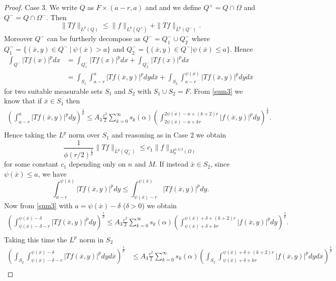 \documentclass[12pt]{article}
\theoremstyle{definition}
\begin{document}
\begin{proof}
Case 3. We write $Q$ as $F \times (a-r,a)$ and and we define $Q^+=Q\cap\Omega$ and $Q^-=Q\cap\Omega^-.$ Then 
\[\|Tf\|_{L^p(Q)}\le\|f\|_{L^p(Q^+)}+\|Tf\|_{L^p(Q^-)}.\]
Moreover $Q^-$ can be furtherly decompose as $Q^-=Q^-_1 \cup Q^-_2$ where $Q^-_1=\{ (\overline x,y) \in Q^- \ | \ \psi(\overline x)>a \}$ and $Q^-_2=\{ (\overline x,y) \in Q^- | \psi(\overline x)\le a \}$. Hence
\begin{align*} \int_{Q^-} |Tf(x)|^pdx &= \int_{Q^-_1} |Tf(x)|^pdx +\int_{Q^-_2} |Tf(x)|^pdx\\
&=\int_{S_1} \int_{a-r}^{a} |Tf(\overline x,y)|^pdy d\overline x+\int_{S_2} \int_{a-r}^{\psi(\overline x)} |Tf(\overline x,y)|^pdy d\overline x
\end{align*}
for two suitable measurable sets $S_1$ and $S_2$ with $S_1 \cup S_2 = F.$ From \eqref{sum3} we know that if $\overline x \in S_1$ then
\begin{align*}
 \left(\int_{a-r}^{a}|Tf(\overline x,y)|^p dy\right)^{\frac{1}{p}} \le A_3\frac{c^2}{2} \sum_{k=0}^\infty s_k(\alpha) \left ( \int_{2\psi(\overline x) -a +kr}^{2\psi(\overline x) -a +(k+2)r}|f(\overline x, y)|^p  dy \right) ^{\frac{1}{p}}. \\
\end{align*}
Hence taking the $L^p$ norm over $S_1$ and reasoning as in Case 2 we obtain
\begin{equation}
\frac{1}{\phi(r/2)^{\frac{1}{p}}} \| Tf\|_{L^p(Q^-_1)} \le c_1 \| f\|_{M_p^{\phi,\delta/2}(\Omega)} \label{q1}
\end{equation}
for some constant $c_1$ depending only on $n$ and $M$. If instead $\overline x \in S_2$, since $\psi(\overline x)\le a$, we have
\begin{equation}
\int_{a-r}^{\psi(\overline x)} |Tf(\overline x,y)|^pdy \le \int_{\psi(\overline x)-r}^{\psi(\overline x)} |Tf(\overline x,y)|^pdy. \label{psia}
\end{equation}
Now from \eqref{sum3} with $a=\psi(\overline x)-\delta$ ($\delta>0$) we obtain
\begin{align*}
 \left(\int_{\psi(\overline x)-\delta-r}^{\psi(\overline x)-\delta}|Tf(\overline x,y)|^p dy\right)^{\frac{1}{p}} \le A_3\frac{c^2}{2} \sum_{k=0}^\infty s_k(\alpha) \left ( \int_{\psi(\overline x) +\delta +kr}^{\psi(\overline x) +\delta +(k+2)r}|f(\overline x, y)|^p  dy \right) ^{\frac{1}{p}}. \\
\end{align*}
Taking this time the $L^p$ norm in $S_2$ 
\begin{align*}
\left(\int_{S_2}\int_{\psi(\overline x)-\delta-r}^{\psi(\overline x)-\delta}|Tf(\overline x,y)|^p dy d\overline x\right)^{\frac{1}{p}} &\le A_3 \frac{c^2}{2} \sum_{k=0}^\infty s_k(\alpha) \left (\int_{S_2} \int_{\psi(\overline x) +\delta +kr}^{\psi(\overline x) +\delta +(k+2)r}|f(\overline x, y)|^p  dy d\overline x\right) ^{\frac{1}{p}}\\

\end{align*}
\end{proof}
\end{document}
